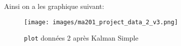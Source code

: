 \documentclass{article}
\begin{document}
\noindent Ainsi on a les graphique suivant:
\begin{figure}[H]
    \centering
    \texttt{[image: images/ma201\_project\_data\_2\_v3.png]}
    \caption{\texttt{plot} données 2 après Kalman Simple}
\end{figure}







\end{document}
